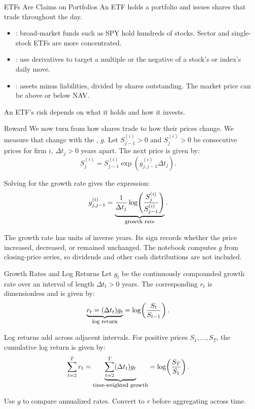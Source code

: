 \documentclass[aspectratio=169,11pt]{beamer}
\begin{document}
\begin{frame}{ETFs Are Claims on Portfolios}
  An ETF holds a portfolio and issues shares that trade throughout the day.

  \vspace{0.7em}
  \begin{itemize}\setlength{\itemsep}{0.7em}
    \item {}: broad-market funds such as SPY hold hundreds of
      stocks. Sector and single-stock ETFs are more concentrated.
    \item {}: use derivatives to target
      a multiple or the negative of a stock's or index's daily move.
    \item {}: assets minus liabilities, divided
      by shares outstanding. The market price can be above or below NAV.
  \end{itemize}

  \vspace{0.6em}
  An ETF's risk depends on what it holds and how it invests.
\end{frame}

\begin{frame}{Reward}
  \vspace{0.3em}
  We now turn from how shares trade to how their prices change. We measure
  that change with the , $g$.
  Let $S_{j-1}^{(i)}>0$ and $S_j^{(i)}>0$ be consecutive prices
  for firm $i$, $\Delta t_j>0$ years apart. The next price is given by:
  \[
    S_j^{(i)}=S_{j-1}^{(i)}\exp\!\left(g_{j,j-1}^{(i)}\Delta t_j\right).
  \]

  Solving for the growth rate gives the expression:
  \[
    g_{j,j-1}^{(i)}=
    \underbrace{\frac{1}{\Delta t_j}\log\!\left(\frac{S_j^{(i)}}{S_{j-1}^{(i)}}\right)}_{\text{\footnotesize growth rate}}.
  \]

  The growth rate has units of inverse years. Its sign records whether the price
  increased, decreased, or remained unchanged. The notebook computes $g$ from
  closing-price series, so dividends and other cash distributions are not
  included.
\end{frame}

\begin{frame}{Growth Rates and Log Returns}
  Let $g_t$ be the continuously compounded growth rate over an interval of
  length $\Delta t_t>0$ years. The corresponding  $r_t$ is
  dimensionless and is given by:
  \[
    \underbrace{r_t=(\Delta t_t)g_t}_{\text{\footnotesize log return}}
    =\log\!\left(\frac{S_t}{S_{t-1}}\right).
  \]

  Log returns add across adjacent intervals. For positive prices
  $S_1,\ldots,S_T$, the cumulative log return is given by:
  \[
    \sum_{t=2}^{T}r_t
    =\underbrace{\sum_{t=2}^{T}(\Delta t_t)g_t}_{\text{\footnotesize time-weighted growth}}
    =\log\!\left(\frac{S_T}{S_1}\right).
  \]

  Use $g$ to compare annualized rates. Convert to $r$ before aggregating across
  time.
\end{frame}
\end{document}
